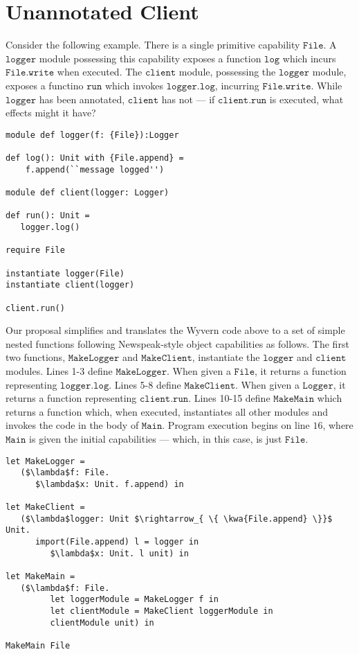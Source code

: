 \documentclass[sigplan,10pt,review]{acmart}\settopmatter{printfolios=true,printccs=false,printacmref=false}
\newcommand{\kwa}[1]{\mathtt{#1}}
\begin{document}
\section{Unannotated Client}

Consider the following example. There is a single primitive capability $\kwa{File}$. A $\kwa{logger}$ module possessing this capability exposes a function $\kwa{log}$ which incurs $\kwa{File.write}$ when executed. The $\kwa{client}$ module, possessing the $\kwa{logger}$ module, exposes a functino $\kwa{run}$ which invokes $\kwa{logger.log}$, incurring $\kwa{File.write}$. While $\kwa{logger}$ has been annotated, $\kwa{client}$ has not --- if $\kwa{client.run}$ is executed, what effects might it have?


\begin{lstlisting}
module def logger(f: {File}):Logger

def log(): Unit with {File.append} =
    f.append(``message logged'')

module def client(logger: Logger)

def run(): Unit =
   logger.log()

require File

instantiate logger(File)
instantiate client(logger)

client.run()
\end{lstlisting}

Our proposal simplifies and translates the Wyvern code above to a set of simple nested functions following Newspeak-style object capabilities as follows. The first two functions, $\kwa{MakeLogger}$ and $\kwa{MakeClient}$, instantiate the $\kwa{logger}$ and $\kwa{client}$ modules. Lines 1-3 define $\kwa{MakeLogger}$. When given a $\kwa{File}$, it returns a function representing $\kwa{logger.log}$. Lines 5-8 define $\kwa{MakeClient}$. When given a $\kwa{Logger}$, it returns a function representing $\kwa{client.run}$. Lines 10-15 define $\kwa{MakeMain}$ which returns a function which, when executed, instantiates all other modules and invokes the code in the body of $\kwa{Main}$. Program execution begins on line $16$, where $\kwa{Main}$ is given the initial capabilities --- which, in this case, is just $\kwa{File}$.

\begin{lstlisting}
let MakeLogger =
   ($\lambda$f: File.
      $\lambda$x: Unit. f.append) in
          
let MakeClient =
   ($\lambda$logger: Unit $\rightarrow_{ \{ \kwa{File.append} \}}$ Unit.
      import(File.append) l = logger in
         $\lambda$x: Unit. l unit) in
          
let MakeMain =
   ($\lambda$f: File.
         let loggerModule = MakeLogger f in
         let clientModule = MakeClient loggerModule in
         clientModule unit) in

MakeMain File
\end{lstlisting}
\end{document}
